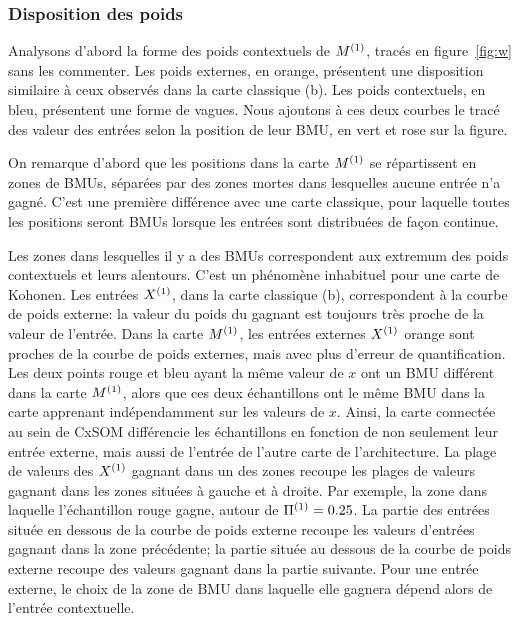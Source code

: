 \documentclass[../main]{subfiles}
\begin{document}
\subsubsection{Disposition des poids}

Analysons d'abord la forme des poids contextuels de $M^{({1})}$, tracés en figure~\ref{fig:w} sans les commenter. Les poids externes, en orange, présentent une disposition similaire à ceux observés dans la carte classique (b). Les poids contextuels, en bleu, présentent une forme de vagues. Nous ajoutons à ces deux courbes le tracé des valeur des entrées selon la position de leur BMU, en vert et rose sur la figure.

On remarque d'abord que les positions dans la carte $M^{({1})}$ se répartissent en zones de BMUs, séparées par des zones mortes dans lesquelles aucune entrée n'a gagné. 
C'est une première différence avec une carte classique, pour laquelle toutes les positions seront BMUs lorsque les entrées sont distribuées de façon continue.


Les zones dans lesquelles il y a des BMUs correspondent aux extremum des poids contextuels et leurs alentours. C'est un phénomène inhabituel pour une carte de Kohonen. 
Les entrées $X^{({1})}$, dans la carte classique (b), correspondent à la courbe de poids externe: la valeur du poids du gagnant est toujours très proche de la valeur de l'entrée. Dans la carte $M^{({1})}$, les entrées externes $X^{({1})}$ orange sont proches de la courbe de poids externes, mais avec plus d'erreur de quantification.
Les deux points rouge et bleu ayant la même valeur de $x$ ont un BMU différent dans la carte $M^{({1})}$, alors que ces deux échantillons ont le même BMU dans la carte apprenant indépendamment sur les valeurs de $x$. Ainsi, la carte connectée au sein de CxSOM différencie les échantillons en fonction de non seulement leur entrée externe, mais aussi de l'entrée de l'autre carte de l'architecture. La plage de valeurs des $X^{({1})}$ gagnant dans un des zones recoupe les plages de valeurs gagnant dans les zones situées à gauche et à droite. Par exemple, la zone dans laquelle l'échantillon rouge gagne, autour de $\Pi^{({1})} = 0.25$. La partie des entrées située en dessous de la courbe de poids externe recoupe les valeurs d'entrées gagnant dans la zone précédente; la partie située au dessous de la courbe de poids externe recoupe des valeurs gagnant dans la partie suivante. Pour une entrée externe, le choix de la zone de BMU dans laquelle elle gagnera dépend alors de l'entrée contextuelle. 
\end{document}
